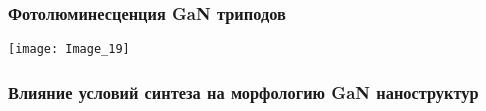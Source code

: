 \begin{frame}
	\frametitle{Фотолюминесценция GaN триподов}
	\centering
	\texttt{[image: Image\_19]}
\end{frame}

\begin{frame}[t]
	\frametitle{Влияние условий синтеза на морфологию GaN наноструктур}
	\centering
	\begin{minipage}[t]{0.9\linewidth}
		\begin{columns}[onlytextwidth]
			\begin{column}{0.4\textwidth}
				\centering
				\\
				\begin{minipage}[t]{0.45\linewidth}
				\end{minipage}
				\begin{minipage}[t]{0.45\linewidth}
				\end{minipage}
			\end{column}
			\begin{column}{0.55\textwidth}
				\centering
				\\
				\begin{minipage}[t]{0.3\linewidth}
				\end{minipage}
				\begin{minipage}[t]{0.3\linewidth}
				\end{minipage}
				\begin{minipage}[t]{0.3\linewidth}
				\end{minipage}
			\end{column}
		\end{columns}
	\end{minipage}
	\\[15pt]
	\begin{minipage}[t]{0.9\linewidth}
		\begin{columns}[onlytextwidth]
			\begin{column}{0.4\textwidth}
				\centering
				\\
				\begin{minipage}[t]{0.45\linewidth}

\end{minipage}
\end{column}
\end{columns}
\end{minipage}
\end{frame}
